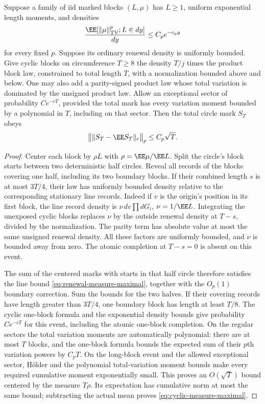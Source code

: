\documentclass[11pt,letterpaper]{article}
\begin{document}
\begin{lemma}
\label{lem:cyclic-measure-maximal}
Suppose a family of iid marked blocks $(L,\mu)$ has $L\ge1$,
uniform exponential length moments, and densities
\[
 \frac{\EE[\|\mu\|_{\rm TV}^p;L\in dy]}{dy}\le C_pe^{-c_py}
\]
for every fixed $p$. Suppose its ordinary renewal density is
uniformly bounded. Give cyclic blocks on circumference $T\ge8$
the density $T/j$ times the product block law, constrained to
total length $T$, with a normalization bounded above and below.
One may also add a parity-signed product law whose total variation
is dominated by the unsigned product law.
Allow an exceptional sector of probability $Ce^{-cT}$, provided
the total mark has every variation moment bounded by a polynomial
in $T$, including on that sector.
Then the total circle mark $S_T$ obeys
\begin{equation}\label{eq:cyclic-measure-maximal}
 \bigl\|\|S_T-\EE S_T\|_{\rm c}\bigr\|_p\le C_p\sqrt T.
\end{equation}
\end{lemma}
\begin{proof}
Center each block by $\rho L$ with
$\rho=\EE\mu/\EE L$. Split the circle's block starts between
two deterministic half circles. Reveal all records of the blocks
covering one half, including its two boundary blocks.
If their combined length $s$ is at most $3T/4$, their law has
uniformly bounded density relative to the corresponding
stationary line records.
Indeed if $v$ is the origin's position in its first block, the
line record density is
$\nu\,dv\prod dG_i$, $\nu=1/\EE L$.
Integrating the unexposed cyclic blocks replaces $\nu$ by
the outside renewal density at $T-s$, divided by the normalization.
The parity term has absolute value at most the same unsigned
renewal density. All these factors are uniformly bounded,
and $\nu$ is bounded away from zero.
The atomic completion at $T-s=0$ is absent on this event.

The sum of the centered marks with starts in that half circle
therefore satisfies the line bound
\eqref{eq:renewal-measure-maximal}, together with the
$O_p(1)$ boundary correction. Sum the bounds for the two halves.
If their covering records have length greater than $3T/4$,
one boundary block has length at least $T/8$.
The cyclic one-block formula and the exponential density
bounds give probability $Ce^{-cT}$ for this event, including
the atomic one-block completion.
On the regular sectors the total variation moments are
automatically polynomial: there are at most $T$ blocks, and
the one-block formula bounds the expected sum of their $p$th
variation powers by $C_pT$.
On the long-block event and the allowed exceptional sector, H\"older and
the polynomial total-variation moment bounds make every
required cumulative moment exponentially small.
This proves an $O(\sqrt T)$ bound centered by the measure $T\rho$.
Its expectation has cumulative norm at most the same bound;
subtracting the actual mean proves
\eqref{eq:cyclic-measure-maximal}.
\end{proof}
\end{document}
